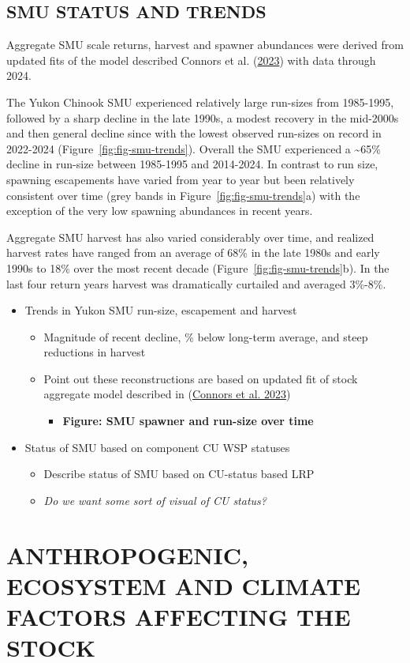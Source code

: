 \documentclass[11pt]{book}
\begin{document}
\hypertarget{smu-status-and-trends}{%
\subsection{SMU STATUS AND TRENDS}\label{smu-status-and-trends}}

Aggregate SMU scale returns, harvest and spawner abundances were derived from updated fits of the model described Connors et al. (\protect\hyperlink{ref-connors_estimates_2023}{2023}) with data through 2024.

The Yukon Chinook SMU experienced relatively large run-sizes from 1985-1995, followed by a sharp decline in the late 1990s, a modest recovery in the mid-2000s and then general decline since with the lowest observed run-sizes on record in 2022-2024 (Figure~\ref{fig:fig-smu-trends}). Overall the SMU experienced a \textasciitilde65\% decline in run-size between 1985-1995 and 2014-2024. In contrast to run size, spawning escapements have varied from year to year but been relatively consistent over time (grey bands in Figure~\ref{fig:fig-smu-trends}a) with the exception of the very low spawning abundances in recent years.

Aggregate SMU harvest has also varied considerably over time, and realized harvest rates have ranged from an average of 68\% in the late 1980s and early 1990s to 18\% over the most recent decade (Figure~\ref{fig:fig-smu-trends}b). In the last four return years harvest was dramatically curtailed and averaged 3\%-8\%.
\begin{itemize}

\item
  Trends in Yukon SMU run-size, escapement and harvest
  \begin{itemize}

  \item
    Magnitude of recent decline, \% below long-term average, and steep reductions in harvest
  \item
    Point out these reconstructions are based on updated fit of stock aggregate model described in (\protect\hyperlink{ref-connors_estimates_2023}{Connors et al. 2023})
    \begin{itemize}

    \item
      \textbf{Figure: SMU spawner and run-size over time}
    \end{itemize}
  \end{itemize}
\item
  Status of SMU based on component CU WSP statuses
  \begin{itemize}

  \item
    Describe status of SMU based on CU-status based LRP
  \item
    \emph{Do we want some sort of visual of CU status?}
  \end{itemize}
\end{itemize}
\hypertarget{sec:factors}{%
\section{ANTHROPOGENIC, ECOSYSTEM AND CLIMATE FACTORS AFFECTING THE STOCK}\label{sec:factors}}
\end{document}
